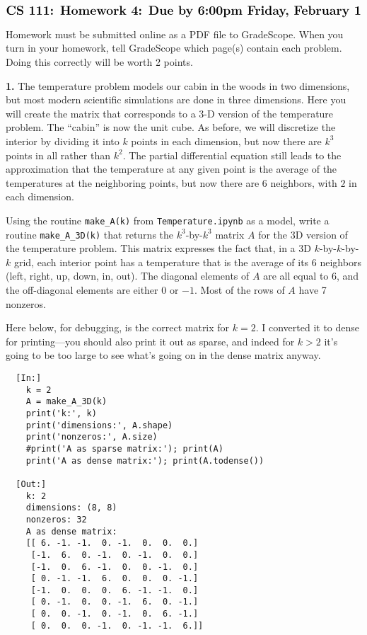 \documentclass[11pt]{article}
\begin{document}
$$\mbox{\Large \bf CS 111: Homework 4: Due by 6:00pm Friday, February 1}$$
\par\bigskip\noindent
Homework must be submitted online as a PDF file to GradeScope.
When you turn in your homework, 
tell GradeScope which page(s) contain each problem. 
Doing this correctly will be worth 2 points.

\par\bigskip
{\bf 1.}
The temperature problem models our cabin in the woods in two dimensions,
but most modern scientific simulations are done in three dimensions.
Here you will create the matrix that corresponds to a 3-D version of 
the temperature problem. The ``cabin'' is now the unit cube. As before,
we will discretize the interior by dividing it into $k$ points in each
dimension, but now there are $k^3$ points in all rather than $k^2$.
The partial differential equation still leads to the approximation
that the temperature at any given point is the average of the temperatures
at the neighboring points, but now there are 6 neighbors, 
with $2$ in each dimension.

Using the routine {\tt make\_A(k)} from {\tt Temperature.ipynb} as a model, 
write a routine {\tt make\_A\_3D(k)} that returns the $k^3$-by-$k^3$ 
matrix $A$ for the 3D version of the temperature problem.
This matrix expresses the fact that, in a 3D $k$-by-$k$-by-$k$ grid, 
each interior point has a temperature that is the average of its 6 neighbors 
(left, right, up, down, in, out).
The diagonal elements of $A$ are all equal to $6$, 
and the off-diagonal elements are either $0$ or $-1$.
Most of the rows of $A$ have 7 nonzeros.

Here below, for debugging, is the correct matrix for $k=2$.
I converted it to dense for printing---you should also
print it out as sparse, and indeed for $k>2$ it's going to be too
large to see what's going on in the dense matrix anyway.

\begin{verbatim}
  [In:]
    k = 2
    A = make_A_3D(k)
    print('k:', k)
    print('dimensions:', A.shape)
    print('nonzeros:', A.size)
    #print('A as sparse matrix:'); print(A)
    print('A as dense matrix:'); print(A.todense())

  [Out:]
    k: 2
    dimensions: (8, 8)
    nonzeros: 32
    A as dense matrix:
    [[ 6. -1. -1.  0. -1.  0.  0.  0.]
     [-1.  6.  0. -1.  0. -1.  0.  0.]
     [-1.  0.  6. -1.  0.  0. -1.  0.]
     [ 0. -1. -1.  6.  0.  0.  0. -1.]
     [-1.  0.  0.  0.  6. -1. -1.  0.]
     [ 0. -1.  0.  0. -1.  6.  0. -1.]
     [ 0.  0. -1.  0. -1.  0.  6. -1.]
     [ 0.  0.  0. -1.  0. -1. -1.  6.]]
\end{verbatim}
\end{document}
